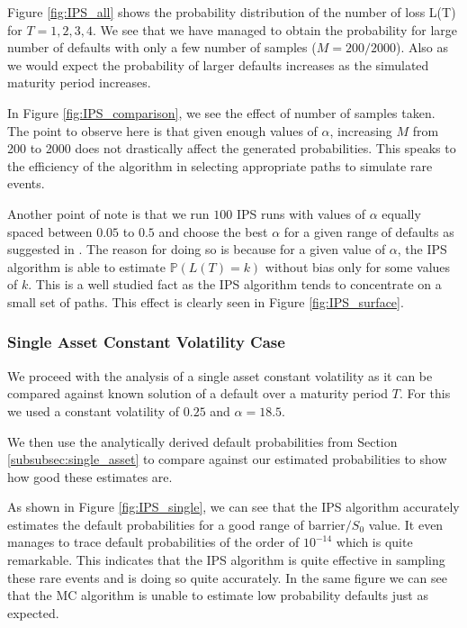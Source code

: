 Figure \ref{fig:IPS_all} shows the probability distribution of the number of
loss L(T) for $T = 1, 2, 3, 4$. We see that we have managed to obtain the
probability for large number of defaults with only a few number of samples ($M =
200/2000$). Also as we would expect the probability of larger defaults increases
as the simulated maturity period increases.

In Figure \ref{fig:IPS_comparison}, we see the effect of number of samples
taken. The point to observe here is that given enough values of $\alpha$, 
increasing $M$ from 200 to 2000 does not drastically affect the generated
probabilities. This speaks to the efficiency of the algorithm in selecting
appropriate paths to simulate rare events.

Another point of note is that we run $100$ IPS runs with values of $\alpha$
equally spaced between $0.05$ to $0.5$ and choose the best $\alpha$ for a given
range of defaults as suggested in \cite{carmona2009importance}. The reason for 
doing so is because for a given value of $\alpha$, the IPS algorithm is able to 
estimate $\mathbb{P}(L(T) = k)$ without bias only for some values of $k$. This
is a well studied fact as the IPS algorithm tends to concentrate on a small set
of paths. This effect is clearly seen in Figure \ref{fig:IPS_surface}.

\subsubsection{Single Asset Constant Volatility Case}
We proceed with the analysis of a single asset constant volatility as it can be
compared against known solution of a default over a maturity period $T$. For
this we used a constant volatility of $0.25$ and $\alpha = 18.5$.

We then use the analytically derived default probabilities from Section
\ref{subsubsec:single_asset} to compare against our estimated probabilities to
show how good these estimates are.

As shown in Figure \ref{fig:IPS_single},  we can see that the IPS algorithm
accurately estimates the default probabilities for a good range of
$\text{barrier}/S_0$ value. It even manages to trace default probabilities of the 
order of $10^{-14}$ which is quite remarkable. This indicates that the IPS
algorithm is quite effective in sampling these rare events and is doing so quite
accurately. In the same figure we can see that the MC algorithm is unable to
estimate low probability defaults just as expected.

